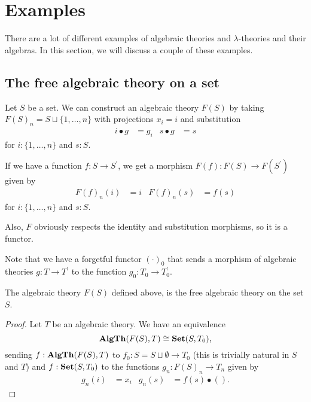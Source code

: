 \section{Examples}\label{sec:algebraic-theory-examples}

There are a lot of different examples of algebraic theories and $ \lambda $-theories and their algebras. In this section, we will discuss a couple of these examples.

\subsection{The free algebraic theory on a set}
\begin{example}
  Let $ S $ be a set. We can construct an algebraic theory $ F(S) $ by taking $ F(S)_n = S \sqcup \{ 1, \dots, n \} $ with projections $ x_i = i $ and substitution
  \begin{align*}
    i \bullet g &= g_i & s \bullet g &= s
  \end{align*}
  for $ i : \{ 1, \dots, n \} $ and $ s : S $.

  If we have a function $ f: S \to S^\prime $, we get a morphism $ F(f): F(S) \to F(S^\prime) $ given by
  \begin{align*}
    F(f)_n(i) &= i & F(f)_n(s) &= f(s)
  \end{align*}
  for $ i : \{ 1, \dots, n \} $ and $ s : S $.

  Also, $ F $ obviously respects the identity and substitution morphisms, so it is a functor.
\end{example}

Note that we have a forgetful functor $ (\cdot)_0 $ that sends a morphism of algebraic theories $ g: T \to T^\prime $ to the function $ g_0: T_0 \to T^\prime_0 $.

\begin{lemma}
  The algebraic theory $ F(S) $ defined above, is the free algebraic theory on the set $ S $.
\end{lemma}
\begin{proof}
  Let $ T $ be an algebraic theory. We have an equivalence
  \[ \mathbf{AlgTh}(F(S), T) \cong \mathbf{Set}(S, T_0), \]
  sending $ f: \mathbf{AlgTh}(F(S), T) $ to $ f_0: S = S \sqcup \emptyset \to T_0 $ (this is trivially natural in $ S $ and $ T $) and $ f: \mathbf{Set}(S, T_0) $ to the functions $ g_n: F(S)_n \to T_n $ given by
  \begin{align*}
    g_n(i) &= x_i & g_n(s) &= f(s) \bullet ().
  \end{align*}
\end{proof}

